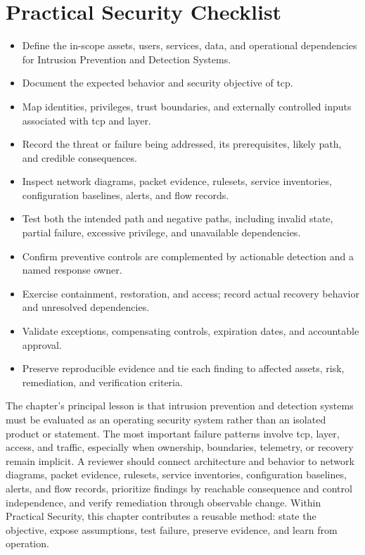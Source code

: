 \documentclass[11pt]{article}
\begin{document}
\section*{Practical Security Checklist}
\begin{itemize}[label=$\square$]
\item Define the in-scope assets, users, services, data, and operational dependencies for Intrusion Prevention and Detection Systems.
\item Document the expected behavior and security objective of tcp.
\item Map identities, privileges, trust boundaries, and externally controlled inputs associated with tcp and layer.
\item Record the threat or failure being addressed, its prerequisites, likely path, and credible consequences.
\item Inspect network diagrams, packet evidence, rulesets, service inventories, configuration baselines, alerts, and flow records.
\item Test both the intended path and negative paths, including invalid state, partial failure, excessive privilege, and unavailable dependencies.
\item Confirm preventive controls are complemented by actionable detection and a named response owner.
\item Exercise containment, restoration, and access; record actual recovery behavior and unresolved dependencies.
\item Validate exceptions, compensating controls, expiration dates, and accountable approval.
\item Preserve reproducible evidence and tie each finding to affected assets, risk, remediation, and verification criteria.
\end{itemize}
\begin{synthesisbox}
The chapter's principal lesson is that intrusion prevention and detection systems must be evaluated as an operating security system rather than an isolated product or statement. The most important failure patterns involve tcp, layer, access, and traffic, especially when ownership, boundaries, telemetry, or recovery remain implicit. A reviewer should connect architecture and behavior to network diagrams, packet evidence, rulesets, service inventories, configuration baselines, alerts, and flow records, prioritize findings by reachable consequence and control independence, and verify remediation through observable change. Within Practical Security, this chapter contributes a reusable method: state the objective, expose assumptions, test failure, preserve evidence, and learn from operation.
\end{synthesisbox}
\end{document}
